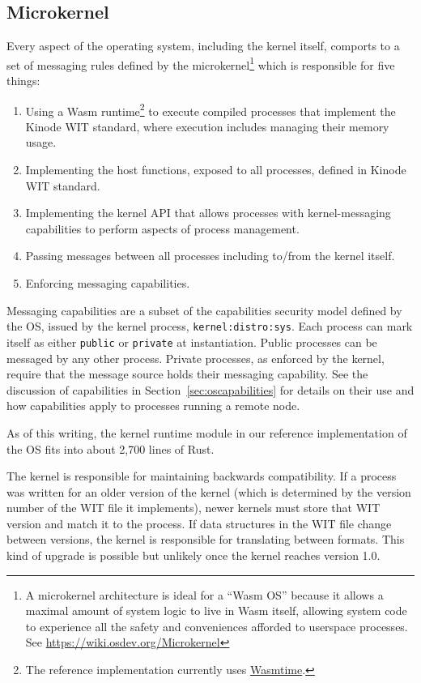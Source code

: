 \documentclass[runningheads]{llncs}
\begin{document}
\subsection{Microkernel}
\label{sec:osmicrokernel}

Every aspect of the operating system, including the kernel itself, comports to a set of messaging rules defined by the microkernel\footnote{A microkernel architecture is ideal for a ``Wasm OS'' because it allows a maximal amount of system logic to live in Wasm itself, allowing system code to experience all the safety and conveniences afforded to userspace processes. See \url{https://wiki.osdev.org/Microkernel}} which is responsible for five things:
\begin{enumerate}
    \item Using a Wasm runtime\footnote{The reference implementation currently uses \href{https://wasmtime.dev}{Wasmtime}.}
    to execute compiled processes that implement the Kinode WIT standard, where execution includes managing their memory usage.
    \item Implementing the host functions, exposed to all processes, defined in Kinode WIT standard.
    \item Implementing the kernel API that allows processes with kernel-messaging capabilities to perform aspects of process management.
    \item Passing messages between all processes including to/from the kernel itself.
    \item Enforcing messaging capabilities.
\end{enumerate}

Messaging capabilities are a subset of the capabilities security model defined by the OS, issued by the kernel process, \verb|kernel:distro:sys|.
Each process can mark itself as either \verb|public| or \verb|private| at instantiation.
Public processes can be messaged by any other process.
Private processes, as enforced by the kernel, require that the message source holds their messaging capability.
See the discussion of capabilities in Section~\ref{sec:oscapabilities} for details on their use and how capabilities apply to processes running a remote node.

As of this writing, the kernel runtime module in our reference implementation of the OS fits into about 2,700 lines of Rust.

The kernel is responsible for maintaining backwards compatibility.
If a process was written for an older version of the kernel (which is determined by the version number of the WIT file it implements), newer kernels must store that WIT version and match it to the process.
If data structures in the WIT file change between versions, the kernel is responsible for translating between formats.
This kind of upgrade is possible but unlikely once the kernel reaches version 1.0.
\end{document}
